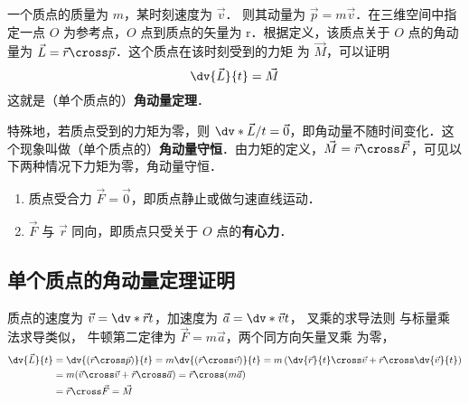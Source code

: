

一个质点的质量为 $m$，某时刻速度为 $\vec v$． 则其动量为 $\vec p = m\vec v$．在三维空间中指定一点 $O$ 为参考点，$O$ 点到质点的矢量为 \vec r．根据定义，该质点关于 $O$ 点的角动量为 $\vec L = \vec r \cross \vec p$．这个质点在该时刻受到的力矩%
为 $\vec M$，可以证明
\begin{equation}
\dv{\vec L}{t} = \vec M
\end{equation} 
这就是（单个质点的）\textbf{角动量定理}．

特殊地，若质点受到的力矩为零，则 $ \dv*{\vec L}/{t} = \vec 0$，即角动量不随时间变化．这个现象叫做（单个质点的）\textbf{角动量守恒}．由力矩的定义，$\vec M = \vec r \cross \vec F$，可见以下两种情况下力矩为零，角动量守恒．
\begin{enumerate}
\item 质点受合力 $\vec F= \vec 0$，即质点静止或做匀速直线运动．
\item $\vec F$ 与 $\vec r$ 同向，即质点只受关于 $O$ 点的\textbf{有心力}．
\end{enumerate}

\subsection{单个质点的角动量定理证明}

质点的速度为 $\vec v = \dv*{\vec r}{t}$，加速度为 $\vec a = \dv*{\vec v}{t}$，
叉乘的求导法则%
与标量乘法求导类似，
牛顿第二定律为%
$\vec F = m\vec a$，两个同方向矢量叉乘%
 为零，
\begin{equation}
\begin{aligned}
\dv{\vec L}{t} &= \dv{( \vec r \cross \vec p )}{t} = m\dv{(\vec r \cross \vec v)}{t}
= m\left( \dv{\vec r}{t} \cross \vec v + \vec r \cross \dv{\vec v}{t} \right)\\
&= m(\vec v \cross \vec v + \vec r \cross \vec a) = \vec r \cross (m\vec a)\\
&= \vec r \cross \vec F = \vec M
\end{aligned}
\end{equation}
 
